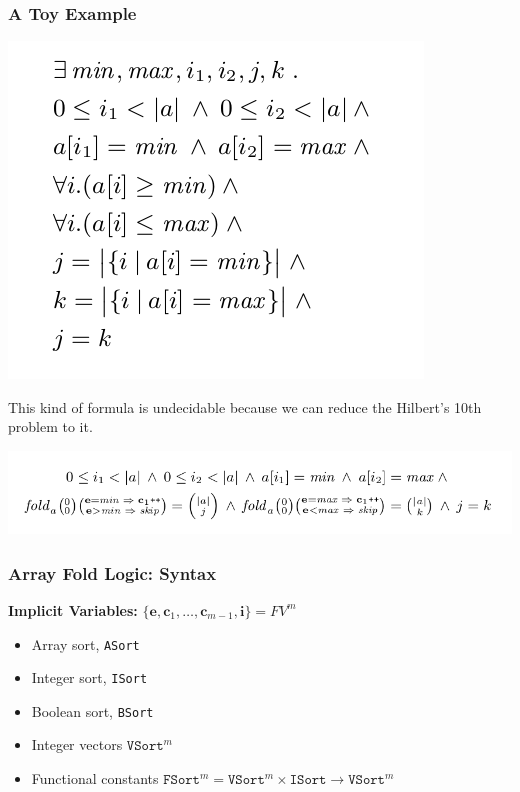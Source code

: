 \documentclass[11pt]{beamer}
\begin{document}
\begin{frame}\frametitle{ A Toy Example}
\begin{center}
\includegraphics[scale=0.3]{f1.png}
\end{center}
This kind of formula is undecidable because we can reduce the Hilbert's 10th problem to it.
\begin{center}
\includegraphics[scale=0.38]{afl1.png}
\end{center}
\end{frame}


\begin{frame}\frametitle{Array Fold Logic: Syntax}
\textbf{Implicit Variables:} $\{\textbf{e}, \textbf{c}_1, \ldots, \textbf{c}_{m-1}, \textbf{i}\} = FV^{m}$

\begin{itemize}
\item Array sort, \texttt{ASort}
\item Integer sort, \texttt{ISort}
\item Boolean sort, \texttt{BSort}
\item Integer vectors $\texttt{VSort}^m$
\item Functional constants $\texttt{FSort}^m = \texttt{VSort}^m\times \texttt{ISort}\rightarrow \texttt{VSort}^m$
\end{itemize}
\end{frame}
\end{document}

